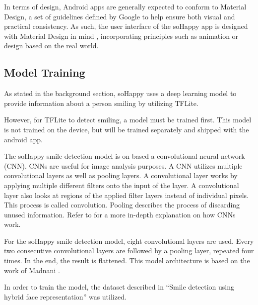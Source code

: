 In terms of design, Android apps are generally expected to conform to Material Design, a set of guidelines defined by Google to help ensure both visual and practical consistency. As such, the user interface of the soHappy app is designed with Material Design in mind \cite{material_design}, incorporating principles such as animation or design based on the real world.

\subsection{Model Training}

As stated in the background section, soHappy uses a deep learning model to 
provide information about a person smiling by utilizing TFLite.

However, for TFLite to detect smiling, a model must be trained first. This
model is not trained on the device, but will be trained separately and shipped
with the android app.

The soHappy smile detection model is on based a convolutional neural network 
(CNN). CNNs are useful for image analysis purposes. A CNN utilizes multiple
convolutional layers as well as pooling layers. A convolutional layer works by
applying multiple different filters onto the input of the layer. A 
convolutional layer also looks at regions of the applied filter layers instead 
of individual pixels. This process is called convolution.
Pooling describes the process of discarding unused information.
Refer to \cite{8308186} for a more in-depth explanation on how CNNs work.

For the soHappy smile detection model, eight convolutional layers are used. 
Every two consecutive convolutional layers are followed by a pooling layer, 
repeated four times. In the end, the result is flattened. This model
architecture is based on the work of Madnani \cite{MayurMadnani2018}.

In order to train the model, the dataset described in ``Smile detection using hybrid face representation'' \cite{Arigbabu2015} was utilized.
